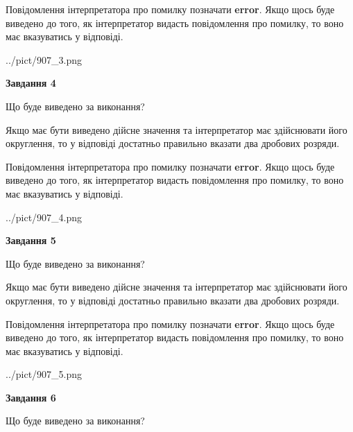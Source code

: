\documentclass[12pt, ukrainian]{article}
\begin{document}
{\begin {Large}
Повідомлення інтерпретатора про помилку позначати \textbf{error}.
Якщо щось буде виведено до того, як інтерпретатор видасть повідомлення про помилку, 
то воно має вказуватись у відповіді. \par

\begin{center}
	{../pict/907_3.png}
\end{center}
\newpage

{\begin {center}\textbf{Завдання 4}\end {center}}\par
Що буде виведено за виконання? \par

Якщо має бути виведено дійсне значення та інтерпретатор має здійснювати його округлення, 
то у відповіді достатньо правильно вказати два дробових розряди.

Повідомлення інтерпретатора про помилку позначати \textbf{error}.
Якщо щось буде виведено до того, як інтерпретатор видасть повідомлення про помилку, 
то воно має вказуватись у відповіді. \par

\begin{center}
	{../pict/907_4.png}
\end{center}
\newpage

{\begin {center}\textbf{Завдання 5}\end {center}}\par
Що буде виведено за виконання? \par

Якщо має бути виведено дійсне значення та інтерпретатор має здійснювати його округлення, 
то у відповіді достатньо правильно вказати два дробових розряди.

Повідомлення інтерпретатора про помилку позначати \textbf{error}.
Якщо щось буде виведено до того, як інтерпретатор видасть повідомлення про помилку, 
то воно має вказуватись у відповіді. \par

\begin{center}
	{../pict/907_5.png}
\end{center}
\newpage

{\begin {center}\textbf{Завдання 6}\end {center}}\par
Що буде виведено за виконання? \par


\end{Large}}
\end{document}
